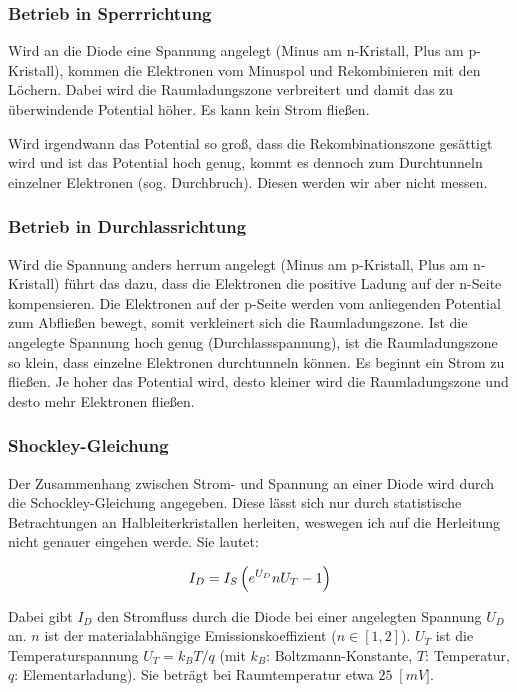 \documentclass[a4paper,german,12pt,smallheadings]{scrartcl}
\begin{document}
\subsubsection{Betrieb in Sperrrichtung}

Wird an die Diode eine Spannung angelegt (Minus am n-Kristall, Plus am
p-Kristall), kommen die Elektronen vom Minuspol und Rekombinieren mit den
Löchern. Dabei wird die Raumladungszone verbreitert und damit das zu
überwindende Potential höher. Es kann kein Strom fließen.

Wird irgendwann das Potential so groß, dass die Rekombinationszone gesättigt
wird und ist das Potential hoch genug, kommt es dennoch zum Durchtunneln
einzelner Elektronen (sog. Durchbruch). Diesen werden wir aber nicht messen.

\subsubsection{Betrieb in Durchlassrichtung}

Wird die Spannung anders herrum angelegt (Minus am p-Kristall, Plus am
n-Kristall) führt das dazu, dass die Elektronen die positive Ladung auf der
n-Seite kompensieren. Die Elektronen auf der p-Seite werden vom anliegenden
Potential zum Abfließen bewegt, somit verkleinert sich die Raumladungszone. Ist
die angelegte Spannung hoch genug (Durchlassspannung), ist die Raumladungszone
so klein, dass einzelne Elektronen durchtunneln können. Es beginnt ein Strom zu
fließen. Je hoher das Potential wird, desto kleiner wird die Raumladungszone
und desto mehr Elektronen fließen.

\subsubsection{Shockley-Gleichung}

Der Zusammenhang zwischen Strom- und Spannung an einer Diode wird durch die
Schockley-Gleichung angegeben. Diese lässt sich nur durch statistische
Betrachtungen an Halbleiterkristallen herleiten, weswegen ich auf die
Herleitung nicht genauer eingehen werde. Sie lautet:

\begin{equation}
  I_D = I_S \del{e^{U_D}{n U_T} - 1}
\end{equation}

Dabei gibt $I_D$ den Stromfluss durch die Diode bei einer angelegten Spannung
$U_D$ an. $n$ ist der materialabhängige Emissionskoeffizient ($n \in [1,2]$).
$U_T$ ist die Temperaturspannung $U_T = k_B T/q$ (mit $k_B$:
Boltzmann-Konstante, $T$: Temperatur, $q$: Elementarladung). Sie beträgt bei
Raumtemperatur etwa $25 \;\operatorname[mV]$.
\end{document}
